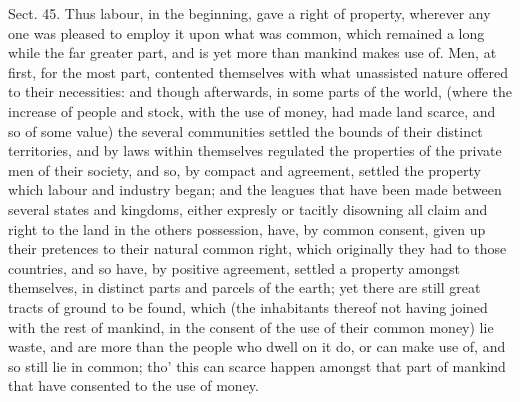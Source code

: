 \documentclass[11pt,openany]{book}
\begin{document}
Sect. 45. Thus labour, in the beginning, gave a right of property, wherever any one was pleased to employ it upon what was common, which remained a long while the far greater part, and is yet more than mankind makes use of. Men, at first, for the most part, contented themselves with what unassisted nature offered to their necessities: and though afterwards, in some parts of the world, (where the increase of people and stock, with the use of money, had made land scarce, and so of some value) the several communities settled the bounds of their distinct territories, and by laws within themselves regulated the properties of the private men of their society, and so, by compact and agreement, settled the property which labour and industry began; and the leagues that have been made between several states and kingdoms, either expresly or tacitly disowning all claim and right to the land in the others possession, have, by common consent, given up their pretences to their natural common right, which originally they had to those countries, and so have, by positive agreement, settled a property amongst themselves, in distinct parts and parcels of the earth; yet there are still great tracts of ground to be found, which (the inhabitants thereof not having joined with the rest of mankind, in the consent of the use of their common money) lie waste, and are more than the people who dwell on it do, or can make use of, and so still lie in common; tho' this can scarce happen amongst that part of mankind that have consented to the use of money.
\end{document}
